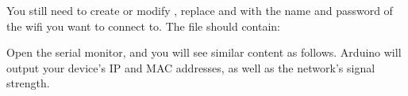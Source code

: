 \documentclass[a4paper,11pt,english]{sphinxmanual}
\begin{document}
\sphinxAtStartPar
You still need to create or modify , replace  and  with the name and password of the wifi you want to connect to. The file should contain:

\begin{sphinxVerbatim}[commandchars=\\\{\}]
\end{sphinxVerbatim}

\sphinxAtStartPar
Open the serial monitor, and you will see similar content as follows. Arduino will output your device’s IP and MAC addresses, as well as the network’s signal strength.

\noindent{}
\end{document}
